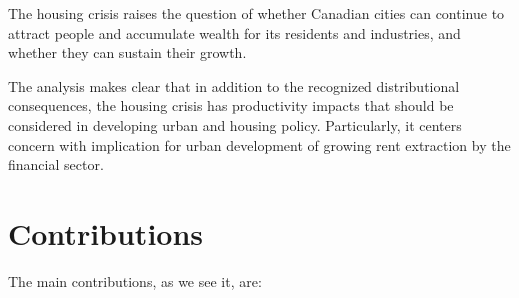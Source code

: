 
The housing crisis raises the question of whether Canadian cities can continue to attract people and accumulate wealth for its residents and industries, and whether they can sustain their growth.





The analysis makes clear that in addition to the recognized distributional consequences, the housing crisis has productivity impacts that should be considered in developing urban and housing policy. Particularly, it centers concern with implication for urban development of growing rent extraction by the financial sector. 

\section{Contributions}

The main contributions, %
as we see it, are:

